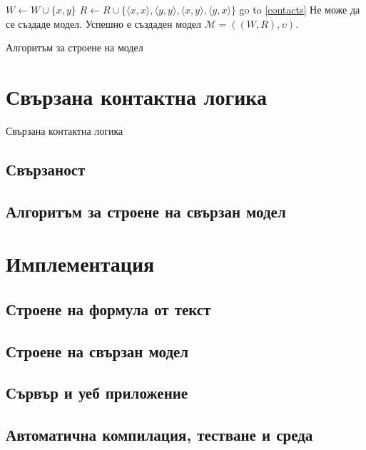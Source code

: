 \documentclass[14pt, aspectratio=169]{beamer}
\makeatletter
\renewcommand\thealgorithm{}
\newcommand{\setalglineno}[1]{\setcounter{ALC@line}{\numexpr#1-1}}
\newcommand\M{\mathcal{M}}
\newcommand{\pair}[2]{ \langle #1, #2 \rangle }
\newcommand{\pairXY}{ \pair{x}{y} }
\newcommand{\pairXX}{ \pair{x}{x} }
\newcommand{\pairYX}{ \pair{y}{x} }
\newcommand{\pairYY}{ \pair{y}{y} }
\makeatother
\begin{document}
\begin{frame}
	\begin{algorithm}[H]
	\renewcommand\thealgorithm{} %
	\begin{algorithmic}[1] %
		\setalglineno{13}
		 \label{contacts}
					\STATE $W \gets W \cup \{x, y \}$
					\STATE $R \gets R \cup \{\pairXX, \pairYY, \pairXY, \pairYX \}$
					\STATE go to \ref{contacts}
				\ENDIF
			\ENDFOR
			\STATE Не може да се създаде модел.
		\ENDFOR
		\STATE Успешно е създаден модел $\M = ((W, R), \upsilon)$.
	\end{algorithmic}

	\caption{Алгоритъм за строене на модел}
	\label{alg:seq}
	\end{algorithm}
\end{frame}

\section{Свързана контактна логика}

\begin{frame}{Свързана контактна логика}
\end{frame}

\subsection{Свързаност}
\subsection{Алгоритъм за строене на свързан модел}

\section{Имплементация}
\subsection{Строене на формула от текст}
\subsection{Строене на свързан модел}
\subsection{Сървър и уеб приложение}
\subsection{Автоматична компилация, тестване и среда}
\end{document}
